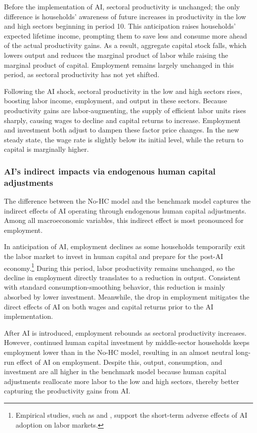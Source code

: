 \documentclass[12pt]{article}
\begin{document}
Before the implementation of AI, sectoral productivity is unchanged; the only difference is households’ awareness of future increases in productivity in the low and high sectors beginning in period 10. This anticipation raises households’ expected lifetime income, prompting them to save less and consume more ahead of the actual productivity gains. As a result, aggregate capital stock falls, which lowers output and reduces the marginal product of labor while raising the marginal product of capital. Employment remains largely unchanged in this period, as sectoral productivity has not yet shifted.

Following the AI shock, sectoral productivity in the low and high sectors rises, boosting labor income, employment, and output in these sectors. Because productivity gains are labor-augmenting, the supply of efficient labor units rises sharply, causing wages to decline and capital returns to increase. Employment and investment both adjust to dampen these factor price changes. In the new steady state, the wage rate is slightly below its initial level, while the return to capital is marginally higher.

\subsubsection{AI's indirect impacts via endogenous human capital adjustments}

The difference between the No-HC model and the benchmark model captures the indirect effects of AI operating through endogenous human capital adjustments. Among all macroeconomic variables, this indirect effect is most pronounced for employment.

In anticipation of AI, employment declines as some households temporarily exit the labor market to invest in human capital and prepare for the post-AI economy.\footnote{Empirical studies, such as \citet{Lerch2021} and \citet{Faber2022}, support the short-term adverse effects of AI adoption on labor markets.} During this period, labor productivity remains unchanged, so the decline in employment directly translates to a reduction in output. Consistent with standard consumption-smoothing behavior, this reduction is mainly absorbed by lower investment. Meanwhile, the drop in employment mitigates the direct effects of AI on both wages and capital returns prior to the AI implementation.

After AI is introduced, employment rebounds as sectoral productivity increases. However, continued human capital investment by middle-sector households keeps employment lower than in the No-HC model, resulting in an almost neutral long-run effect of AI on employment. Despite this, output, consumption, and investment are all higher in the benchmark model because human capital adjustments reallocate more labor to the low and high sectors, thereby better capturing the productivity gains from AI.
\end{document}
